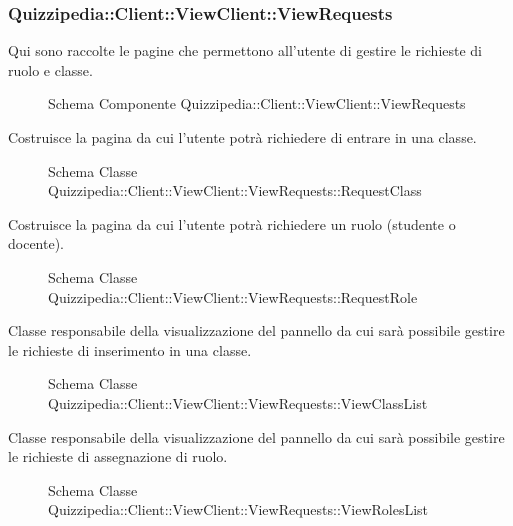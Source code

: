 \subsubsection{Quizzipedia::Client::ViewClient::ViewRequests}
Qui sono raccolte le pagine che permettono all'utente di gestire le richieste di ruolo e classe.
\begin{figure}[H]
\centering
\noindent{}
\caption{Schema Componente Quizzipedia::Client::ViewClient::ViewRequests}
\end{figure}
Costruisce la pagina da cui l'utente potrà richiedere di entrare in una classe.
\begin{figure}[H]
\centering
\noindent{}
\caption{Schema Classe Quizzipedia::Client::ViewClient::ViewRequests::RequestClass}
\end{figure}
Costruisce la pagina da cui l'utente potrà richiedere un ruolo (studente o docente).
\begin{figure}[H]
\centering
\noindent{}
\caption{Schema Classe Quizzipedia::Client::ViewClient::ViewRequests::RequestRole}
\end{figure}
Classe responsabile della visualizzazione del pannello da cui sarà possibile gestire le richieste di inserimento in una classe.
\begin{figure}[H]
\centering
\noindent{}
\caption{Schema Classe Quizzipedia::Client::ViewClient::ViewRequests::ViewClassList}
\end{figure}
Classe responsabile della visualizzazione del pannello da cui sarà possibile gestire le richieste di assegnazione di ruolo.
\begin{figure}[H]
\centering
\noindent{}
\caption{Schema Classe Quizzipedia::Client::ViewClient::ViewRequests::ViewRolesList}
\end{figure}
